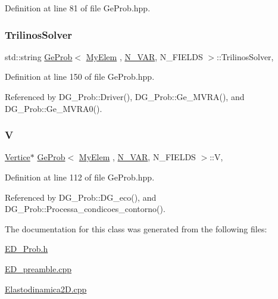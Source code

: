 Definition at line 81 of file Ge\+Prob.\+hpp.

\mbox{\label{classGeProb_aac89bac6728a7f42998e0edb80dc835d}} 
\subsubsection{\texorpdfstring{Trilinos\+Solver}{TrilinosSolver}}
{\footnotesize\ttfamily std\+::string \hyperlink{classGeProb}{Ge\+Prob}$<$ \hyperlink{DG__Prob_8h_a83cd887ced9a6587428f267e50cd4787}{My\+Elem} , \hyperlink{classED__Prob_a4e7d2ff1a8e435e336fb00c527224b5a}{N\+\_\+\+V\+AR}, N\+\_\+\+F\+I\+E\+L\+DS $>$\+::Trilinos\+Solver\hspace{0.3cm}{\ttfamily [protected]}, {\ttfamily [inherited]}}



Definition at line 150 of file Ge\+Prob.\+hpp.



Referenced by D\+G\+\_\+\+Prob\+::\+Driver(), D\+G\+\_\+\+Prob\+::\+Ge\+\_\+\+M\+V\+R\+A(), and D\+G\+\_\+\+Prob\+::\+Ge\+\_\+\+M\+V\+R\+A0().

\mbox{\label{classGeProb_aaa26398869b601604a4a5f3032c46070}} 
\subsubsection{\texorpdfstring{V}{V}}
{\footnotesize\ttfamily \hyperlink{structVertice}{Vertice}$\ast$ \hyperlink{classGeProb}{Ge\+Prob}$<$ \hyperlink{DG__Prob_8h_a83cd887ced9a6587428f267e50cd4787}{My\+Elem} , \hyperlink{classED__Prob_a4e7d2ff1a8e435e336fb00c527224b5a}{N\+\_\+\+V\+AR}, N\+\_\+\+F\+I\+E\+L\+DS $>$\+::V\hspace{0.3cm}{\ttfamily [protected]}, {\ttfamily [inherited]}}



Definition at line 112 of file Ge\+Prob.\+hpp.



Referenced by D\+G\+\_\+\+Prob\+::\+D\+G\+\_\+eco(), and D\+G\+\_\+\+Prob\+::\+Processa\+\_\+condicoes\+\_\+contorno().



The documentation for this class was generated from the following files\+:\begin{DoxyCompactItemize}
\item 
\hyperlink{ED__Prob_8h}{E\+D\+\_\+\+Prob.\+h}\item 
\hyperlink{ED__preamble_8cpp}{E\+D\+\_\+preamble.\+cpp}\item 
\hyperlink{Elastodinamica2D_8cpp}{Elastodinamica2\+D.\+cpp}\end{DoxyCompactItemize}
